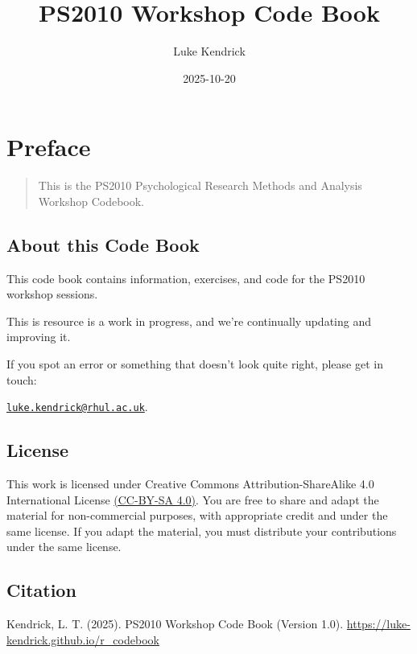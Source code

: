 \documentclass[
]{book}
\title{PS2010 Workshop Code Book}
\author{Luke Kendrick}
\date{2025-10-20}
\let\oldsection\section
\renewcommand{\section}{\needspace{5\baselineskip}\oldsection}
\begin{document}
\maketitle

{
\setcounter{tocdepth}{1}
\tableofcontents
}
\chapter*{Preface}\label{preface}

\begin{quote}
This is the PS2010 Psychological Research Methods and Analysis Workshop Codebook.
\end{quote}

\section{About this Code Book}\label{about-this-code-book}

This code book contains information, exercises, and code for the PS2010 workshop sessions.

This is resource is a work in progress, and we're continually updating and improving it.

If you spot an error or something that doesn't look quite right, please get in touch:

\href{mailto:luke.kendrick@rhul.ac.uk}{\nolinkurl{luke.kendrick@rhul.ac.uk}}.

\section{\texorpdfstring{\textbf{License}}{License}}\label{license}

This work is licensed under Creative Commons Attribution-ShareAlike 4.0 International License \href{https://creativecommons.org/licenses/by-sa/4.0/}{(CC-BY-SA 4.0)}. You are free to share and adapt the material for non-commercial purposes, with appropriate credit and under the same license. If you adapt the material, you must distribute your contributions under the same license.

\section{\texorpdfstring{\textbf{Citation}}{Citation}}\label{citation}

Kendrick, L. T. (2025). PS2010 Workshop Code Book (Version 1.0). \url{https://luke-kendrick.github.io/r_codebook}
\end{document}

